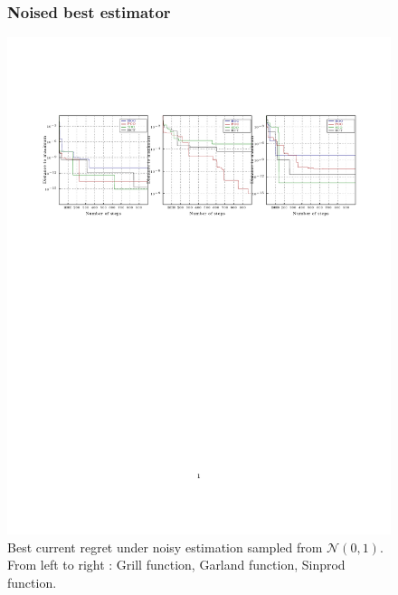 \documentclass[xcolor={usenames,dvipsnames}]{beamer}
\begin{document}
\begin{frame}
\begin{figure}
\frametitle{Noised best estimator}
\includegraphics[trim={2cm 6cm 1cm 4cm},clip,scale = 0.65]{best1000_1.pdf}
\vspace*{-8cm}
 \caption{\label{fig:noise1}Best current regret under noisy estimation sampled from $\mathcal{N}(0,1)$. From left to right : Grill function, Garland function, Sinprod function.}
\end{figure}
\end{frame}
\end{document}
